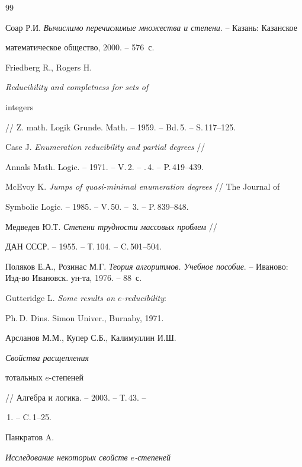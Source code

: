 \begin{thebibliography}{99}







Соар Р.И. {\em Вычислимо перечислимые множества и степени}. -- Казань: Казанское


математическое общество, 2000. -- 576~с.




Friedberg R., Rogers H. {\em Reducibility and completness for sets of 


integers} // Z. math. Logik Grunde. Math. -- 1959. -- Bd.\,5. -- S.\,117--125.




Case J. {\em Enumeration reducibility and partial degrees} //


Annals Math. Logic. -- 1971. -- V.\,2. -- \No.\,4. -- P.\,419--439.




McEvoy K. {\em Jumps of quasi-minimal enumeration degrees} // The Journal of


Symbolic Logic. -- 1985. -- V.\,50. -- \No\,3. -- P.\,839--848.




Медведев Ю.Т. {\em Степени трудности массовых проблем} //


ДАН СССР. -- 1955. -- Т.\,104. -- C.\,501--504.




Поляков Е.А., Розинас М.Г. {\em Теория алгоритмов. Учебное пособие}. -- Иваново: Изд-во Ивановск. ун-та, 1976. -- 88~с.




Gutteridge L. {\em Some results on $e$-reducibility}:


Ph.\,D. Dins. Simon Univer., Burnaby, 1971.






Арсланов М.М., Купер С.Б., Калимуллин И.Ш. {\em Свойства расщепления


тотальных $e$-степеней} // Алгебра и логика. -- 2003. -- Т.\,43. --


\No\,1. -- C.\,1--25.




Панкратов A. {\em Исследование некоторых свойств $e$-степеней 


}
\end{thebibliography}
